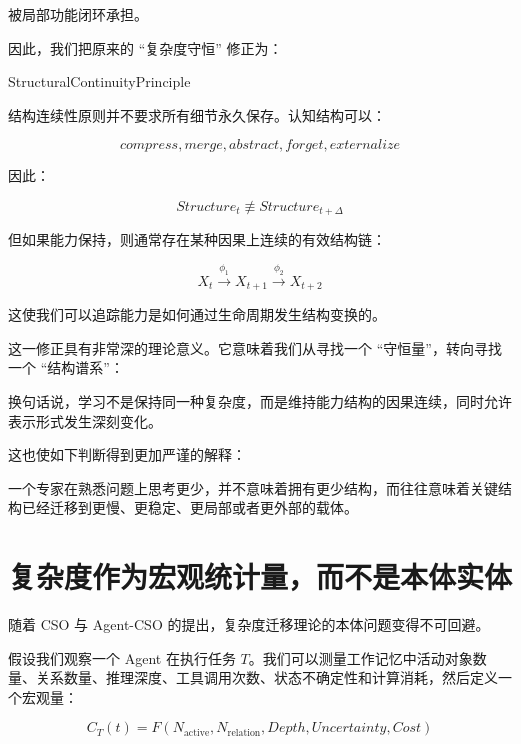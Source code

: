 被局部功能闭环承担。

因此，我们把原来的 ``复杂度守恒'' 修正为：

\begin{statementbox}
StructuralContinuityPrinciple
\end{statementbox}

结构连续性原则并不要求所有细节永久保存。认知结构可以：

\[
compress,
merge,
abstract,
forget,
externalize
\]

因此：

\[
Structure_t
\not\equiv
Structure_{t+\Delta}
\]

但如果能力保持，则通常存在某种因果上连续的有效结构链：

\[
X_t
\xrightarrow{\phi_1}
X_{t+1}
\xrightarrow{\phi_2}
X_{t+2}
\]

这使我们可以追踪能力是如何通过生命周期发生结构变换的。

这一修正具有非常深的理论意义。它意味着我们从寻找一个 ``守恒量''，转向寻找一个 ``结构谱系''：

\begin{statementbox}
\centering
{}
\end{statementbox}

换句话说，学习不是保持同一种复杂度，而是维持能力结构的因果连续，同时允许表示形式发生深刻变化。

这也使如下判断得到更加严谨的解释：

\begin{statementbox}
\centering
{}
\end{statementbox}

一个专家在熟悉问题上思考更少，并不意味着拥有更少结构，而往往意味着关键结构已经迁移到更慢、更稳定、更局部或者更外部的载体。

\section{复杂度作为宏观统计量，而不是本体实体}
\label{sec:complexity-not-ontology}

随着 CSO 与 Agent-CSO 的提出，复杂度迁移理论的本体问题变得不可回避。

假设我们观察一个 Agent 在执行任务 $T$。我们可以测量工作记忆中活动对象数量、关系数量、推理深度、工具调用次数、状态不确定性和计算消耗，然后定义一个宏观量：

\[
C_T(t)
=
F(
N_{\mathrm{active}},
N_{\mathrm{relation}},
Depth,
Uncertainty,
Cost
)
\]

